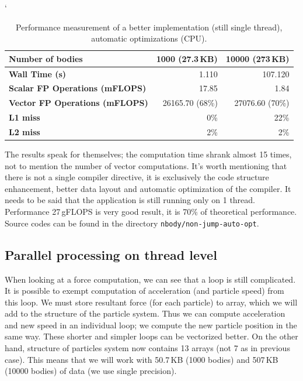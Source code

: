 \begin{table}[ht]
\catcode`
\begin{center}
\begin{tabular}{| l | r | r |} \hline
\textbf{Number of bodies} & 1000 (27.3\,KB) & 10000 (273\,KB)\\ \hline
\textbf{Wall Time (s)} & 1.110 & 107.120\\ \hline
\textbf{Scalar FP Operations (mFLOPS)} & 17.85 & 1.84\\ \hline
\textbf{Vector FP Operations (mFLOPS)} & 26165.70 (68\%) & 27076.60 (70\%)\\ \hline
\textbf{L1 miss} & 0\% & 22\%\\ \hline
\textbf{L2 miss} & 2\% & 2\%\\ \hline
\end{tabular}
\caption{Performance measurement of a better implementation (still single thread), automatic optimizations (CPU).}
\label{tab:table_nbody_enhancement}
\end{center}
\end{table}

The results speak for themselves; the computation time shrank almost 15 times, not to mention the number of vector computations. It's worth mentioning that there is not a single compiler directive, it is exclusively the code structure enhancement, better data layout and automatic optimization of the compiler. It needs to be said that the application is still running only on 1 thread. Performance 27\,gFLOPS is very good result, it is 70\% of theoretical performance. Source codes can be found in the directory \texttt{nbody/non-jump-auto-opt}.

\subsection{Parallel processing on thread level}
\label{sec:body_omp}
When looking at a force computation, we can see that a loop is still complicated. It is possible to exempt computation of acceleration (and particle speed) from this loop. We must store resultant force (for each particle) to array, which we will add to the structure of the particle system. Thus we can compute acceleration and new speed in an individual loop; we compute the new particle position in the same way. These shorter and simpler loops can be vectorized better. On the other hand, structure of particles system now contains 13 arrays (not 7 as in previous case). This means that we will work with 50.7\,KB (1000 bodies) and 507\,KB (10000 bodies) of data (we use single precision).

